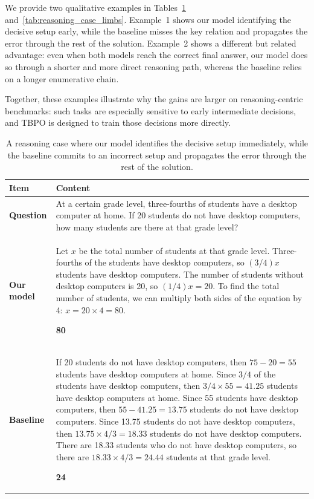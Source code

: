 \documentclass{article}
\theoremstyle{plain}
\theoremstyle{definition}
\theoremstyle{remark}
\begin{document}
We provide two qualitative examples in Tables~\ref{tab:reasoning_case_desktop} and~\ref{tab:reasoning_case_limbs}. Example~1 shows our model identifying the decisive setup early, while the baseline misses the key relation and propagates the error through the rest of the solution. Example~2 shows a different but related advantage: even when both models reach the correct final answer, our model does so through a shorter and more direct reasoning path, whereas the baseline relies on a longer enumerative chain.

Together, these examples illustrate why the gains are larger on reasoning-centric benchmarks: such tasks are especially sensitive to early intermediate decisions, and TBPO is designed to train those decisions more directly.

\begin{table}[t]
\centering
\small
\setlength{\tabcolsep}{6pt}
\renewcommand{\arraystretch}{1.2}
\begin{tabular}{p{}p{}}
\toprule
\textbf{Item} & \textbf{Content} \\
\midrule
\textbf{Question} &
At a certain grade level, three-fourths of students have a desktop computer at home. If 20 students do not have desktop computers, how many students are there at that grade level? \\
\midrule
\textbf{Our model} &
Let $x$ be the total number of students at that grade level. Three-fourths of the students have desktop computers, so $(3/4)x$ students have desktop computers. The number of students without desktop computers is 20, so $(1/4)x = 20$. To find the total number of students, we can multiply both sides of the equation by 4: $x = 20 \times 4 = 80$.

\textbf{80} \\
\midrule
\textbf{Baseline} &
If 20 students do not have desktop computers, then $75 - 20 = 55$ students have desktop computers at home. Since $3/4$ of the students have desktop computers, then $3/4 \times 55 = 41.25$ students have desktop computers at home. Since 55 students have desktop computers, then $55 - 41.25 = 13.75$ students do not have desktop computers. Since 13.75 students do not have desktop computers, then $13.75 \times 4/3 = 18.33$ students do not have desktop computers. There are 18.33 students who do not have desktop computers, so there are $18.33 \times 4/3 = 24.44$ students at that grade level.

\textbf{24} \\
\bottomrule
\end{tabular}
\caption{A reasoning case where our model identifies the decisive setup immediately, while the baseline commits to an incorrect setup and propagates the error through the rest of the solution.}
\label{tab:reasoning_case_desktop}
\end{table}
\end{document}
